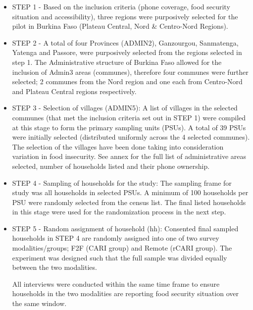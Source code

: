 \documentclass[11pt,harvard]{article}
\begin{document}
	\begin{itemize}[label=--, left=1.5em]
		\item[1.] STEP 1 - Based on the inclusion criteria (phone coverage, food security situation and accessibility), three regions were purposively selected for the pilot in Burkina Faso (Plateau Central, Nord \& Centro-Nord Regions). 
		
		\item[2.] STEP 2 - A total of four Provinces (ADMIN2), Ganzourgou, Sanmatenga, Yatenga and Passore, were purposively selected from the regions selected in step 1. The Administrative structure of Burkina Faso allowed for the inclusion of Admin3 areas (communes), therefore four communes were further selected; 2 communes from the Nord region and one each from Centro-Nord and Plateau Central regions respectively. 
		
		\item[3.] STEP 3 - Selection of villages (ADMIN5): A list of villages in the selected communes (that met the inclusion criteria set out in STEP 1) were compiled at this stage to form the primary sampling units (PSUs). A total of 39 PSUs were initially selected (distributed uniformly across the 4 selected communes). The selection of the villages have been done taking into consideration variation in food insecurity. See annex for the full list of administrative areas selected, number of households listed and their phone ownership.
		
		\item[4.] STEP 4 - Sampling of households for the study: The sampling frame for study was all households in selected PSUs. A minimum of 100 households per PSU were randomly selected from the census list. The final listed households in this stage were used for the randomization process in the next step.
		
		\item[5.] STEP 5 - Random assignment of household (hh): Consented final sampled households in STEP 4 are randomly assigned into one of two survey modalities/groups; F2F (CARI group) and Remote (rCARI group). The experiment was designed such that the full sample was divided equally between the two modalities.
	
		All interviews were conducted within the same time frame to ensure households in the two modalities are reporting food security situation over the same window. 
	\end{itemize}
	
	
	\pagebreak
	
\end{document}
